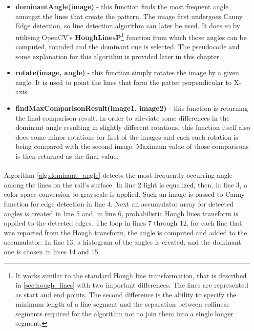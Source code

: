 \begin{itemize}
	\item \textbf{dominantAngle(image)} - this function finds the most frequent angle amongst the lines that create the pattern. The image first undergoes Canny Edge detection, so line detection algorithm can later be used. It does so by utilising OpenCV's \textbf{HoughLinesP}\footnote{It works similar to the standard Hough line transformation, that is described in \autoref{sec:hough_lines} with two important differences. The lines are represented as start and end points. The second difference is the ability to specify the minimum length of a line segment and the separation between collinear segments required for the algorithm not to join them into a single longer segment.\cite{learning-opencv-3}} function from which those angles can be computed, rounded and the dominant one is selected. The pseudocode and some explanation for this algorithm is provided later in this chapter.
	\item \textbf{rotate(image, angle)} - this function simply rotates the image by a given angle. It is used to point the lines that form the patter perpendicular to X-axis.
	\item \textbf{findMaxComparisonResult(image1, image2)} - this function is returning the final comparison result. In order to alleviate some differences in the dominant angle resulting in slightly different rotations, this function itself also does some minor rotations for first of the images and each such rotation is being compared with the second image. Maximum value of those comparisons is then returned as the final value.
\end{itemize}

\paragraph{}
Algorithm \ref{alg:dominant_angle} detects the most-frequently occurring angle among the lines on the rail's surface. In line 2 light is equalized, then, in line 3, a color space conversion to grayscale is applied. Such an image is passed to Canny function for edge detection in line 4. Next an accumulator array for detected angles is created in line 5 and, in line 6, probabilistic Hough lines transform is applied to the detected edges. The loop in lines 7 through 12, for each line that was reported from the Hough transform, the angle is computed and added to the accumulator. In line 13, a histogram of the angles is created, and the dominant one is chosen in lines 14 and 15.

